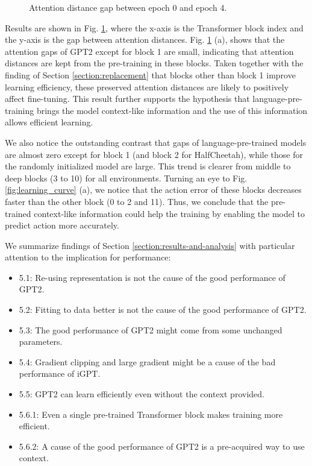 \begin{figure}[ht]
\begin{minipage}[b]{0.32\linewidth}
    \end{minipage}
    \caption{Attention distance gap between epoch 0 and epoch 4.}
    \label{fig:attention_distance_before_after_epoch_4}
\end{figure}

Results are shown in Fig. \ref{fig:attention_distance_before_after_epoch_4}, where the x-axis is the Transformer block index and the y-axis is the gap between attention distances. Fig. \ref{fig:attention_distance_before_after_epoch_4} (a), shows that the attention gaps of GPT2 except for block 1 are small, indicating that attention distances are kept from the pre-training in these blocks. Taken together with the finding of Section \ref{section:replacement} that blocks other than block 1 improve learning efficiency, these preserved attention distances are likely to positively affect fine-tuning. This result further supports the hypothesis that language-pre-training brings the model context-like information and the use of this information allows efficient learning.

We also notice the outstanding contrast that gaps of language-pre-trained models are almost zero except for block 1 (and block 2 for HalfCheetah), while those for the randomly initialized model are large. This trend is clearer from middle to deep blocks (3 to 10) for all environments. Turning an eye to Fig. \ref{fig:learning_curve} (a), we notice that the action error of these blocks decreases faster than the other block (0 to 2 and 11). Thus, we conclude that the pre-trained context-like information could help the training by enabling the model to predict action more accurately.

We summarize findings of Section \ref{section:results-and-analysis} with particular attention to the implication for performance:
\begin{itemize}
    \item 5.1: Re-using representation is not the cause of the good performance of GPT2.
    \item 5.2: Fitting to data better is not the cause of the good performance of GPT2.
    \item 5.3: The good performance of GPT2 might come from some unchanged parameters.
    \item 5.4: Gradient clipping and large gradient might be a cause of the bad performance of iGPT.
    \item 5.5: GPT2 can learn efficiently even without the context provided.
    \item 5.6.1: Even a single pre-trained Transformer block makes training more efficient.
    \item 5.6.2: A cause of the good performance of GPT2 is a pre-acquired way to use context.
\end{itemize}
